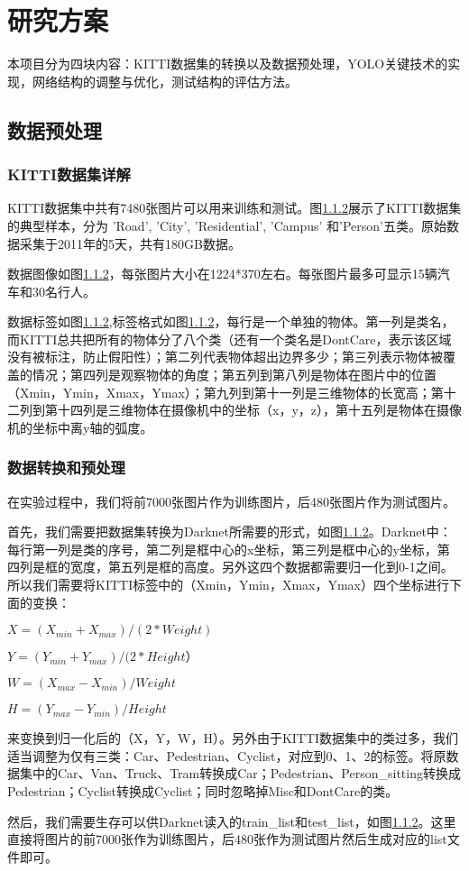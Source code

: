 \chapter{研究方案}
本项目分为四块内容：KITTI数据集的转换以及数据预处理，YOLO关键技术的实现，网络结构的调整与优化，测试结构的评估方法。
\section{数据预处理}{
	\subsection{KITTI数据集详解}
	KITTI数据集中共有7480张图片可以用来训练和测试。图\ref{}展示了KITTI数据集的典型样本，分为 ’Road’, ’City’, ’Residential’, ’Campus’ 和’Person’五类。原始数据采集于2011年的5天，共有180GB数据。

	数据图像如图\ref{}，每张图片大小在1224*370左右。每张图片最多可显示15辆汽车和30名行人。

	数据标签如图\ref{},标签格式如图\ref{}，每行是一个单独的物体。第一列是类名，而KITTI总共把所有的物体分了八个类（还有一个类名是DontCare，表示该区域没有被标注，防止假阳性）；第二列代表物体超出边界多少；第三列表示物体被覆盖的情况；第四列是观察物体的角度；第五列到第八列是物体在图片中的位置（Xmin，Ymin，Xmax，Ymax）；第九列到第十一列是三维物体的长宽高；第十二列到第十四列是三维物体在摄像机中的坐标（x，y，z），第十五列是物体在摄像机的坐标中离y轴的弧度。

	\subsection{数据转换和预处理}
	在实验过程中，我们将前7000张图片作为训练图片，后480张图片作为测试图片。

	首先，我们需要把数据集转换为Darknet所需要的形式，如图\ref{}。Darknet中：每行第一列是类的序号，第二列是框中心的x坐标，第三列是框中心的y坐标，第四列是框的宽度，第五列是框的高度。另外这四个数据都需要归一化到0-1之间。所以我们需要将KITTI标签中的（Xmin，Ymin，Xmax，Ymax）四个坐标进行下面的变换：

	$X = (X_{min} + X_{max}) / (2 * Weight)$

	$Y = (Y_{min} + Y_{max}) / (2 * Height）$

	$W = (X_{max} - X_{min}) / Weight$

	$H = (Y_{max} - Y_{min}) / Height$

	来变换到归一化后的（X，Y，W，H）。另外由于KITTI数据集中的类过多，我们适当调整为仅有三类：Car、Pedestrian、Cyclist，对应到0、1、2的标签。将原数据集中的Car、Van、Truck、Tram转换成Car；Pedestrian、Person\_sitting转换成Pedestrian；Cyclist转换成Cyclist；同时忽略掉Misc和DontCare的类。

	然后，我们需要生存可以供Darknet读入的train\_list和test\_list，如图\ref{}。这里直接将图片的前7000张作为训练图片，后480张作为测试图片然后生成对应的list文件即可。
}

